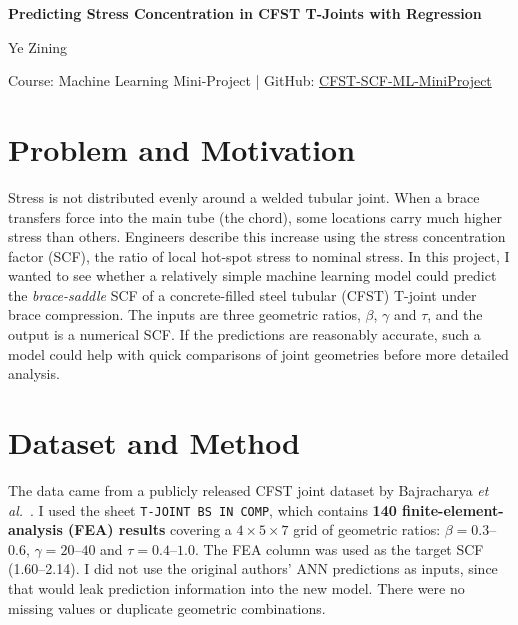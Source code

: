 \documentclass[10pt,a4paper]{article}
\begin{document}
\begin{center}
{\Large\bfseries Predicting Stress Concentration in CFST T-Joints with Regression\par}
\vspace{5pt}
{\normalsize Ye Zining\par}
\vspace{2pt}
{\small Course: Machine Learning Mini-Project \quad | \quad GitHub: \href{https://github.com/yejacob18-prog/CFST-SCF-ML-MiniProject}{CFST-SCF-ML-MiniProject}\par}
\end{center}
\vspace{-6pt}

\section{Problem and Motivation}
Stress is not distributed evenly around a welded tubular joint. When a brace transfers force into the main tube (the chord), some locations carry much higher stress than others. Engineers describe this increase using the stress concentration factor (SCF), the ratio of local hot-spot stress to nominal stress. In this project, I wanted to see whether a relatively simple machine learning model could predict the \emph{brace-saddle} SCF of a concrete-filled steel tubular (CFST) T-joint under brace compression. The inputs are three geometric ratios, $\beta$, $\gamma$ and $\tau$, and the output is a numerical SCF. If the predictions are reasonably accurate, such a model could help with quick comparisons of joint geometries before more detailed analysis.

\section{Dataset and Method}
The data came from a publicly released CFST joint dataset by Bajracharya \emph{et al.}~\cite{dataset,paper}. I used the sheet \texttt{T-JOINT BS IN COMP}, which contains \textbf{140 finite-element-analysis (FEA) results} covering a $4\times5\times7$ grid of geometric ratios: $\beta=0.3$--$0.6$, $\gamma=20$--$40$ and $\tau=0.4$--$1.0$. The FEA column was used as the target SCF (1.60--2.14). I did not use the original authors' ANN predictions as inputs, since that would leak prediction information into the new model. There were no missing values or duplicate geometric combinations.
\end{document}

